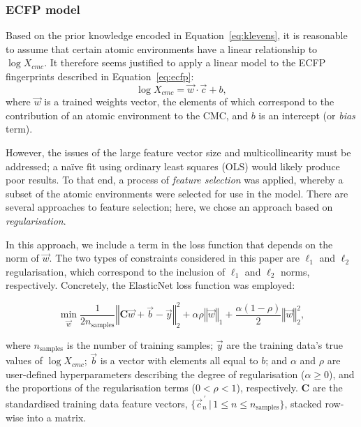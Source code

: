\subsubsection{ECFP model}

Based on the prior knowledge encoded in Equation~\ref{eq:klevens}, it is
reasonable to assume that certain atomic environments have a linear relationship to $\log X_{cmc}$. It therefore seems justified to apply a linear model to the ECFP fingerprints described in Equation~\ref{eq:ecfp}:
\begin{equation}
    \label{eq:linear-ecfp}
    \log X_{cmc} = \vec{w} \cdot \vec{c} + b,
\end{equation}
where $\vec{w}$ is a trained weights vector, the elements of which correspond to the contribution of an atomic environment to the CMC, and $b$ is an intercept (or \emph{bias} term).

However, the issues of the large feature vector size and multicollinearity must be addressed; a na\"ive fit using ordinary least squares (OLS) would likely produce poor results. To that end, a process of \emph{feature selection} was
applied, whereby a subset of the atomic environments were selected for use in the model. There are several approaches to feature selection\cite{liFeatureSelectionData2017}; here, we chose an approach based on \emph{regularisation}.

In this approach, we include a term in the loss function that depends on the
norm of $\vec{w}$. The two types of constraints considered in this paper are
$\ell_1$ and $\ell_2$ regularisation, which correspond to the inclusion of
$\ell_1$ and $\ell_2$ norms, respectively. Concretely, the ElasticNet
\cite{zouRegularizationVariableSelection2005} loss function was employed:

\begin{equation}
    \label{eq:elastic}
    \min_{\vec{w}} { \frac{1}{2n_{\text{samples}}} \left \Vert \mathbf{C}\vec{w} + \vec{b}- \vec{y} \right \Vert_2 ^ 2 + \alpha\rho \left \Vert \vec{w} \right \Vert_1} + \frac{\alpha(1 - \rho)}{2} \left \Vert \vec{w} \right \Vert_2^2,
\end{equation}

where $n_{\text{samples}}$ is the number of training samples; $\vec{y}$ are the
training data's true values of $\log X_{cmc}$; $\vec{b}$ is a vector with
elements all equal to $b$; and $\alpha$ and $\rho$ are user-defined
hyperparameters describing the degree of regularisation ($\alpha \geq 0$), and
the proportions of the regularisation terms ($0 < \rho < 1$), respectively.
$\mathbf{C}$ are the standardised training data feature vectors,
$\{\vec{c}^{\,\prime}_n \,|\, 1 \leq n \leq n_\text{samples}\}$, stacked
row-wise into a matrix.

